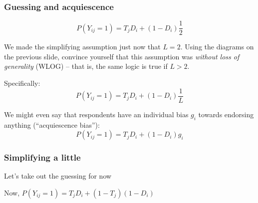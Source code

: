 \documentclass[aspectratio=169]{beamer}
\begin{document}
\begin{frame}
    \frametitle{Guessing and acquiescence}
    
$$P\left(Y_{ij} = 1\right) = T_jD_i + \left(1-D_i\right)\frac{1}{2}$$

We made the simplifying assumption just now that $L=2$.  Using the diagrams on the previous slide, convince yourself that this assumption was \emph{without loss of generality} (WLOG) -- that is, the same logic is true if $L > 2$.\pause

Specifically:
$$P\left(Y_{ij} = 1\right) = T_jD_i + \left(1-D_i\right)\frac{1}{L}$$\pause

We might even say that respondents have an individual bias $g_i$ towards endorsing anything (``acquiescence bias''):
$$P\left(Y_{ij} = 1\right) = T_jD_i + \left(1-D_i\right)g_i$$

\end{frame}


\begin{frame}
    \frametitle{Simplifying a little}
    
    Let's take out the guessing for now
    \begin{center}
    \end{center}
    
    Now, $P\left(Y_{ij}=1\right) = T_jD_i + \left(1-T_j\right)\left(1-D_i\right)$
\end{frame}
\end{document}
